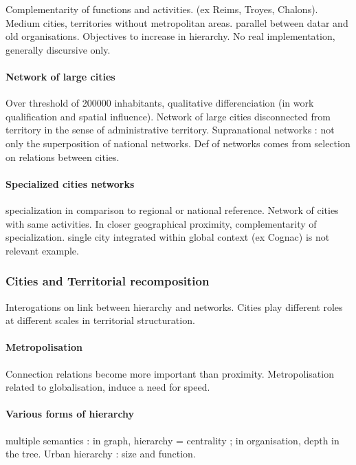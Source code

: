 Complementarity of functions and activities. (ex Reims, Troyes, Chalons). Medium cities, territories without metropolitan areas. parallel between datar and old organisations. Objectives to increase in hierarchy. No real implementation, generally discursive only.

\paragraph{Network of large cities}

Over threshold of 200000 inhabitants, qualitative differenciation (in work qualification and spatial influence). Network of large cities disconnected from territory in the sense of administrative territory. Supranational networks : not only the superposition of national networks. Def of networks comes from selection on relations between cities.

\paragraph{Specialized cities networks}

specialization in comparison to regional or national reference. Network of cities with same activities. In closer geographical proximity, complementarity of specialization. single city integrated within global context (ex Cognac) is not relevant example.

\subsubsection*{Cities and Territorial recomposition}

Interogations on link between hierarchy and networks. Cities play different roles at different scales in territorial structuration.

\paragraph{Metropolisation}

Connection relations become more important than proximity. Metropolisation related to globalisation, induce a need for speed.

\paragraph{Various forms of hierarchy}

multiple semantics : in graph, hierarchy = centrality ; in organisation, depth in the tree. Urban hierarchy : size and function.

